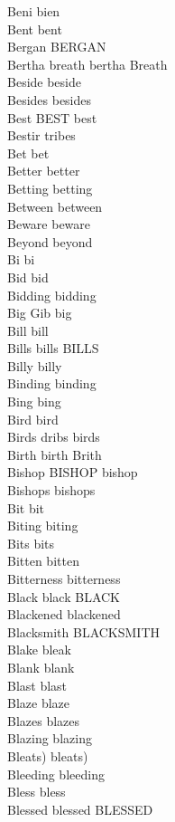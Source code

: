 Beni bien\\
Bent bent\\
Bergan BERGAN\\
Bertha breath bertha Breath\\
Beside beside\\
Besides besides\\
Best BEST best\\
Bestir tribes\\
Bet bet\\
Better better\\
Betting betting\\
Between between\\
Beware beware\\
Beyond beyond\\
Bi bi\\
Bid bid\\
Bidding bidding\\
Big Gib big\\
Bill bill\\
Bills bills BILLS\\
Billy billy\\
Binding binding\\
Bing bing\\
Bird bird\\
Birds dribs birds\\
Birth birth Brith\\
Bishop BISHOP bishop\\
Bishops bishops\\
Bit bit\\
Biting biting\\
Bits bits\\
Bitten bitten\\
Bitterness bitterness\\
Black black BLACK\\
Blackened blackened\\
Blacksmith BLACKSMITH\\
Blake bleak\\
Blank blank\\
Blast blast\\
Blaze blaze\\
Blazes blazes\\
Blazing blazing\\
Bleats) bleats)\\
Bleeding bleeding\\
Bless bless\\
Blessed blessed BLESSED\\
